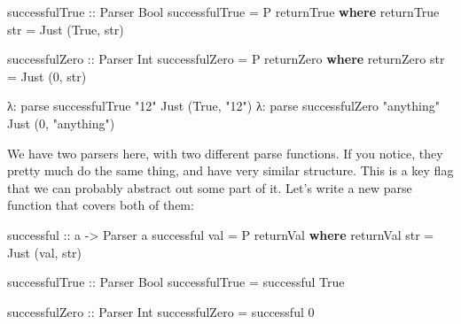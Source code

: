 \documentclass[]{article}
\newenvironment{Shaded}{}{}
\newcommand{\DataTypeTok}[1]{\textcolor[rgb]{0.56,0.13,0.00}{#1}}
\newcommand{\DecValTok}[1]{\textcolor[rgb]{0.25,0.63,0.44}{#1}}
\newcommand{\KeywordTok}[1]{\textcolor[rgb]{0.00,0.44,0.13}{\textbf{#1}}}
\newcommand{\NormalTok}[1]{#1}
\newcommand{\OperatorTok}[1]{\textcolor[rgb]{0.40,0.40,0.40}{#1}}
\newcommand{\OtherTok}[1]{\textcolor[rgb]{0.00,0.44,0.13}{#1}}
\newcommand{\StringTok}[1]{\textcolor[rgb]{0.25,0.44,0.63}{#1}}
\begin{document}
\begin{Shaded}
\begin{Highlighting}[]
\OtherTok{successfulTrue ::} \DataTypeTok{Parser} \DataTypeTok{Bool}
\NormalTok{successfulTrue }\OtherTok{=} \DataTypeTok{P}\NormalTok{ returnTrue}
    \KeywordTok{where}
\NormalTok{        returnTrue str }\OtherTok{=} \DataTypeTok{Just}\NormalTok{ (}\DataTypeTok{True}\NormalTok{, str)}

\OtherTok{successfulZero ::} \DataTypeTok{Parser} \DataTypeTok{Int}
\NormalTok{successfulZero }\OtherTok{=} \DataTypeTok{P}\NormalTok{ returnZero}
    \KeywordTok{where}
\NormalTok{        returnZero str }\OtherTok{=} \DataTypeTok{Just}\NormalTok{ (}\DecValTok{0}\NormalTok{, str)}
\end{Highlighting}
\end{Shaded}

\begin{Shaded}
\begin{Highlighting}[]
\NormalTok{λ}\OperatorTok{:}\NormalTok{ parse successfulTrue }\StringTok{"12"}
\DataTypeTok{Just}\NormalTok{ (}\DataTypeTok{True}\NormalTok{, }\StringTok{"12"}\NormalTok{)}
\NormalTok{λ}\OperatorTok{:}\NormalTok{ parse successfulZero }\StringTok{"anything"}
\DataTypeTok{Just}\NormalTok{ (}\DecValTok{0}\NormalTok{, }\StringTok{"anything"}\NormalTok{)}
\end{Highlighting}
\end{Shaded}

We have two parsers here, with two different parse functions. If you notice,
they pretty much do the same thing, and have very similar structure. This is a
key flag that we can probably abstract out some part of it. Let's write a new
parse function that covers both of them:

\begin{Shaded}
\begin{Highlighting}[]
\OtherTok{successful ::}\NormalTok{ a }\OtherTok{{-}\textgreater{}} \DataTypeTok{Parser}\NormalTok{ a}
\NormalTok{successful val }\OtherTok{=} \DataTypeTok{P}\NormalTok{ returnVal}
    \KeywordTok{where}
\NormalTok{        returnVal str }\OtherTok{=} \DataTypeTok{Just}\NormalTok{ (val, str)}

\OtherTok{successfulTrue ::} \DataTypeTok{Parser} \DataTypeTok{Bool}
\NormalTok{successfulTrue }\OtherTok{=}\NormalTok{ successful }\DataTypeTok{True}

\OtherTok{successfulZero ::} \DataTypeTok{Parser} \DataTypeTok{Int}
\NormalTok{successfulZero }\OtherTok{=}\NormalTok{ successful }\DecValTok{0}
\end{Highlighting}
\end{Shaded}
\end{document}
